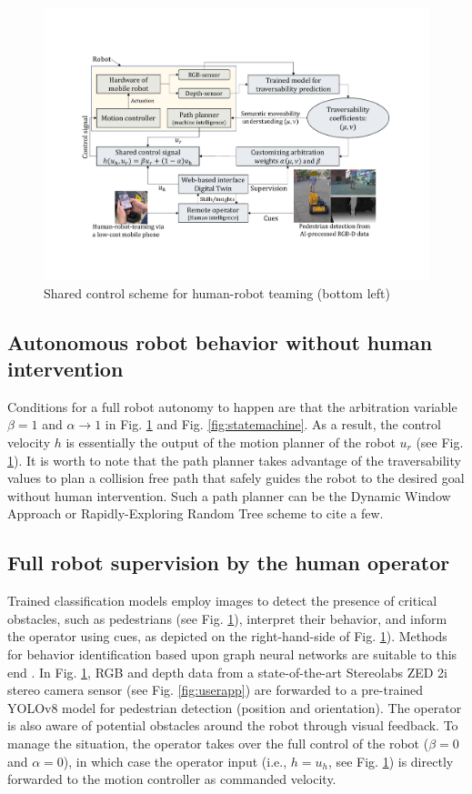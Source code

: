 \documentclass[letterpaper, 10 pt, conference]{ieeeconf}  %
\begin{document}
   \begin{figure}[ht]
	\centerline{\includegraphics[width=\columnwidth]{images/transversability2.pdf}}
	\caption{Shared control scheme for human-robot teaming (bottom left)}
	\label{fig:architecture}
\end{figure}
\subsection{Autonomous robot behavior without human intervention}
Conditions for a full robot autonomy to happen are that the arbitration variable $\beta=1$ and $\alpha\rightarrow 1$ in 	Fig. \ref{fig:architecture} and Fig. \ref{fig:statemachine}. As a result, the control velocity $h$ is essentially the output of the motion planner of the  robot $u_r$ (see Fig. \ref{fig:architecture}). It is worth to note that the path planner takes advantage of the traversability values to plan a collision free path that safely guides  the robot to the desired goal without human intervention.  Such a path planner can be the Dynamic Window Approach or  Rapidly-Exploring Random Tree scheme  \cite{leung2022hybrid} to cite a few.

\subsection{Full robot supervision by the human operator}
Trained classification models employ images to detect the presence of critical obstacles, such as pedestrians (see Fig. \ref{fig:architecture}), interpret their behavior, and inform the operator using cues, as depicted on the right-hand-side of Fig. \ref{fig:architecture}). Methods for behavior identification based upon graph neural networks are suitable to this end \cite{jang2024multi}. In Fig. \ref{fig:architecture}, RGB and depth data from a state-of-the-art Stereolabs ZED 2i stereo camera sensor (see 	Fig. \ref{fig:userapp}) are forwarded to a pre-trained YOLOv8 model for pedestrian detection (position and orientation). The operator is also aware of potential obstacles around the robot  through visual feedback. To manage the situation, the operator takes over the full control of the robot ($\beta = 0$ and $\alpha = 0$), in which case the operator input (i.e., $h=u_h$, see Fig. \ref{fig:architecture}) is directly forwarded to the motion controller as commanded velocity.
\end{document}
